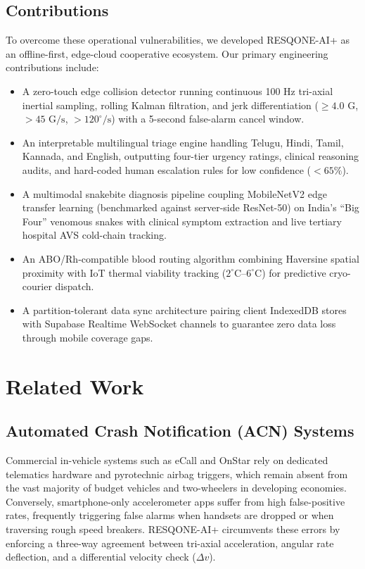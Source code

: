 \documentclass[conference]{IEEEtran}
\begin{document}
\subsection{Contributions}
To overcome these operational vulnerabilities, we developed RESQONE-AI+ as an offline-first, edge-cloud cooperative ecosystem. Our primary engineering contributions include:
\begin{itemize}
    \item A zero-touch edge collision detector running continuous 100 Hz tri-axial inertial sampling, rolling Kalman filtration, and jerk differentiation ($\ge 4.0\text{ G}$, $> 45\text{ G/s}$, $> 120^\circ/\text{s}$) with a 5-second false-alarm cancel window.
    \item An interpretable multilingual triage engine handling Telugu, Hindi, Tamil, Kannada, and English, outputting four-tier urgency ratings, clinical reasoning audits, and hard-coded human escalation rules for low confidence ($< 65\%$).
    \item A multimodal snakebite diagnosis pipeline coupling MobileNetV2 edge transfer learning (benchmarked against server-side ResNet-50) on India's ``Big Four'' venomous snakes with clinical symptom extraction and live tertiary hospital AVS cold-chain tracking.
    \item An ABO/Rh-compatible blood routing algorithm combining Haversine spatial proximity with IoT thermal viability tracking ($2^\circ\text{C}$--$6^\circ\text{C}$) for predictive cryo-courier dispatch.
    \item A partition-tolerant data sync architecture pairing client IndexedDB stores with Supabase Realtime WebSocket channels to guarantee zero data loss through mobile coverage gaps.
\end{itemize}

\section{Related Work}

\subsection{Automated Crash Notification (ACN) Systems}
Commercial in-vehicle systems such as eCall and OnStar rely on dedicated telematics hardware and pyrotechnic airbag triggers, which remain absent from the vast majority of budget vehicles and two-wheelers in developing economies. Conversely, smartphone-only accelerometer apps suffer from high false-positive rates, frequently triggering false alarms when handsets are dropped or when traversing rough speed breakers. RESQONE-AI+ circumvents these errors by enforcing a three-way agreement between tri-axial acceleration, angular rate deflection, and a differential velocity check ($\Delta v$).
\end{document}

